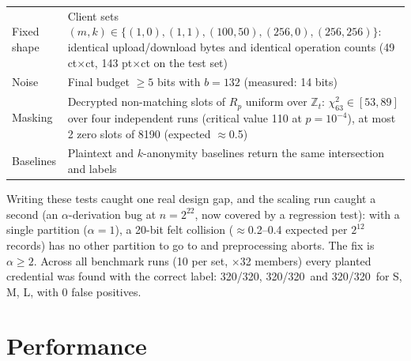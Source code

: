 \documentclass[11pt]{article}
\newcommand{\RunsS}{10}
\newcommand{\TPS}{320}
\newcommand{\TPM}{320}
\newcommand{\FPM}{0}
\newcommand{\TPL}{320}
\begin{document}
\begin{table}[tbp]
\begin{tabularx}{\textwidth}{@{}p{4.6cm}L@{}}
Fixed shape & Client sets $(m,k)\in\{(1,0),(1,1),(100,50),(256,0),(256,256)\}$: identical upload/download bytes and identical operation counts (49 ct$\times$ct, 143 pt$\times$ct on the test set) \\
Noise & Final budget $\ge5$ bits with $b=132$ (measured: 14 bits) \\
Masking & Decrypted non-matching slots of $R_p$ uniform over $\mathbb{Z}_t$: $\chi^2_{63}\in[53,89]$ over four independent runs (critical value 110 at $p=10^{-4}$), at most 2 zero slots of 8190 (expected $\approx$0.5) \\
Baselines & Plaintext and $k$-anonymity baselines return the same intersection and labels \\
\bottomrule
\end{tabularx}
\end{table}

\noindent Writing these tests caught one real design gap, and the scaling run caught a second (an $\alpha$-derivation bug at $n=2^{22}$, now covered by a regression test): with a single partition ($\alpha=1$), a 20-bit felt collision ($\approx$0.2--0.4 expected per $2^{12}$ records) has no other partition to go to and preprocessing aborts. The fix is $\alpha\ge2$. Across all benchmark runs (\RunsS{} per set, $\times$32 members) every planted credential was found with the correct label: \TPS/\TPS, \TPM/\TPM\ and \TPL/\TPL\ for S, M, L, with \FPM{} false positives.

\section{Performance}
\end{document}
